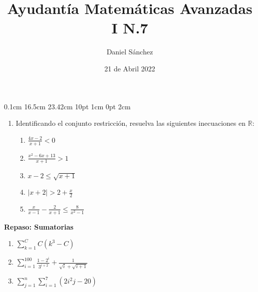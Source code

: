 \documentclass[12pt]{article}
\newcommand{\D}{\displaystyle}
\begin{document}
\setmargins{2.5cm}
{0.1cm}
{16.5cm}
{23.42cm}
{10pt}
{1cm}
{0pt}
{2cm}

\title{Ayudant\'ia Matem\'aticas Avanzadas I N.7}
\date{21 de Abril 2022}
\author{Daniel S\'anchez}
\maketitle

\begin{enumerate}

      \item Identificando el conjunto restricci\'on, resuelva las siguientes inecuaciones en $\mathbb{R}$:
            \begin{enumerate}
                  \item $\D \frac{4x-2}{x+1}<0$
                  \item $\D \frac{x^2-6x+13}{x+1}>1$
                  \item $\D x-2\leq \sqrt{x+1}$
                  \item $\D |x+2|>2+\frac{x}{2}$
                  \item $\D \frac{x}{x-1}-\frac{2}{x+1} \leq \frac{8}{x^2-1}$
            \end{enumerate}
\end{enumerate}

\textbf{Repaso: Sumatorias}
\begin{enumerate}
      \item $\D \sum_{k=1}^{C} C(k^3-C)$
      \item $\D \sum_{i=1}^{100} \frac{1-2^i}{3^{i+2}} + \frac{1}{\sqrt{i} + \sqrt{i+1}}$
      \item $\D \sum_{j=1}^{n} \sum_{i=1}^{7} \left( 2i^2j-20 \right)$
\end{enumerate}
\end{document}
